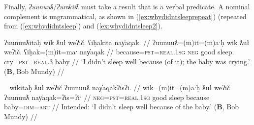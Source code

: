 
Finally, \textit{ʔuunuuƛ}/\textit{ʔunw̓iiƛ} must take a result that is a verbal predicate. A nominal complement is ungrammatical, as shown in (\ref{ex:whydidntsleeprepeat}) (repeated from (\ref{ex:whydidntsleep}) and (\ref{ex:whydidntsleep2}).

\ex \label{ex:whydidntsleeprepeat}
\begingl
\glpreamble ʔuunuuƛitaḥ wik ƛuł weʔič. ʕiḥakita nay̓aqak. //
\gla ʔuunuuƛ=(m)it=(m)aˑḥ wik ƛuł weʔič. ʕiḥak=(m)it=maˑ nay̓aqak //
\glb because=\textsc{pst}=\textsc{real.1sg} \textsc{neg} good sleep. cry=\textsc{pst}=\textsc{real.3} baby //
\glft `I didn't sleep well because (of it); the baby was crying.' (\textbf{B}, Bob Mundy) //
\endgl
\xe

\ex~ \label{ex:whydidntsleep2}
\begingl
\glpreamble *wikitaḥ ƛuł weʔič ʔuunuuƛ nay̓aqakʔisʔi. //
\gla wik=(m)it=(m)aˑḥ ƛuł weʔič ʔuunuuƛ nay̓aqak=ʔis=ʔiˑ //
\glb \textsc{neg}=\textsc{pst}=\textsc{real.1sg} good sleep because baby=\textsc{dim}=\textsc{art} //
\glft Intended: `I didn't sleep well because of the baby.' (\textbf{B}, Bob Mundy) //
\endgl
\xe

\begin{comment}
\ex~ \label{ex:uunuutl4}
\begingl
\glpreamble *hitaʔapweʔin kaatkimqsuptaał t̓an̓eʔisʔi ʔuunuuƛ našuk. //
\gla hitaʔap=weˑʔin kaatkimqsuptaał t̓an̓a=ʔis=ʔiˑ ʔuunuuƛ našuk //
\glb win=\textsc{hrsy.3} race child=\textsc{dim}=\textsc{art} because strong //
\glft Intended: `The kid won the race because he is strong.' (\textbf{B}, Bob Mundy) //
\endgl
\xe

\vspace{5pt}
\end{comment}

\begin{comment}
Becausatives also follow the typical verbal pattern of being able to freely drop arguments, already seen in (\ref{ex:uunuutl1}) and again in (\ref{ex:becausechanged}).

\vspace{5pt}

Context for (\ref{ex:becausechanged}): A retelling of traditional ways of life. This followed an explanation of how this isn't done anymore, and a lengthy pause.

\ex~ \label{ex:becausechanged}
\begingl
\glpreamble ʔunʔuuƛ̓aƛʔał kʷiisḥin. //
\gla ʔunʔuuƛ=!aƛ=ʔał kʷis-L.ḥin //
\glb because=\textsc{now}=\textsc{pl} different-\textsc{dr} //
\glft `Because they're different now.' (\textbf{C}, \textit{tupaat} Julia Lucas) //
\endgl
\xe
\end{comment}

